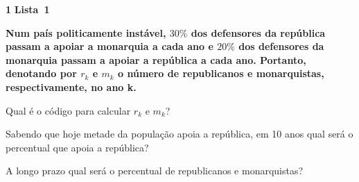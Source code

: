 \documentclass{article}
\newenvironment{question}
    {\medskip\bfseries\large}
    {\medskip}
\newcounter{exe-list}
\newenvironment{exe-list}
    {\begin{list}{(\alph{exe-list})}{\usecounter{exe-list}}}
    {\end{list}}
\newenvironment{exe}[2][Sala]
    {\bigskip\noindent\par\ifthenelse{\equal{#1}{}}%
        {\textbf{\LARGE #2}}%
        {\textbf{\LARGE #1~#2}}%
    \medskip\noindent\par}
    {\bigskip}
\begin{document}
\begin{exe}[Lista]{1}
    \begin{question}
        Num país politicamente instável,
        \(30\%\) dos defensores da república
        passam a apoiar a monarquia a cada ano e
        \(20\%\) dos defensores da monarquia
        passam a apoiar a república a cada ano.
        Portanto, denotando por \(r_k\) e \(m_k\)
        o número de republicanos e monarquistas,
        respectivamente, no ano k.
        \begin{exe-list}
            \item
                Qual é o código para calcular
                \(r_k\) e \(m_k\)?
            \item
                Sabendo que hoje metade da população
                apoia a república,
                em 10 anos
                qual será o percentual que apoia a república?
            \item
                A longo prazo qual será
                o percentual de republicanos e monarquistas?
        \end{exe-list}
    \end{question}
\end{exe}
\end{document}
